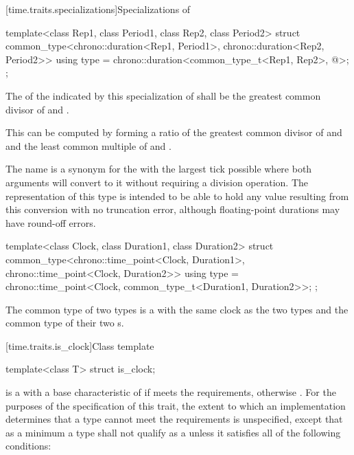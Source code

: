 [time.traits.specializations]{Specializations of }

%
\begin{itemdecl}
template<class Rep1, class Period1, class Rep2, class Period2>
struct common_type<chrono::duration<Rep1, Period1>, chrono::duration<Rep2, Period2>> {
  using type = chrono::duration<common_type_t<Rep1, Rep2>, @\seebelow@>;
};
\end{itemdecl}

\pnum
The  of the  indicated by this specialization of
 shall be the greatest common divisor of  and
. \begin{note} This can be computed by forming a ratio of the
greatest common divisor of  and  and the
least common multiple of  and .
\end{note}

\pnum
\begin{note} The  name  is a synonym for the
 with the largest tick  possible where both
 arguments will convert to it without requiring a division
operation. The representation of this type is intended to be able to hold any
value resulting from this conversion with no truncation error, although
floating-point durations may have round-off errors. \end{note}

%
\begin{itemdecl}
template<class Clock, class Duration1, class Duration2>
  struct common_type<chrono::time_point<Clock, Duration1>, chrono::time_point<Clock, Duration2>> {
    using type = chrono::time_point<Clock, common_type_t<Duration1, Duration2>>;
};
\end{itemdecl}

\pnum
The common type of two  types is a  with the same
clock as the two types and the common type of their two s.

[time.traits.is_clock]{Class template }

%
\begin{itemdecl}
template<class T> struct is_clock;
\end{itemdecl}

\pnum
{} is a 
with a base characteristic of 
if  meets the  requirements,
otherwise .
For the purposes of the specification of this trait,
the extent to which an implementation determines
that a type cannot meet the  requirements is unspecified,
except that as a minimum
a type  shall not qualify as a 
unless it satisfies all of the following conditions:

